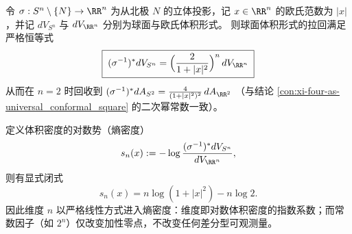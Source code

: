 
\begin{proposition}\label{prop:xi-stereographic-jacobian-entropy-density}
令 \(\sigma:S^{n}\setminus\{N\}\to\RR^{n}\) 为从北极 \(N\) 的立体投影，记 \(x\in\RR^{n}\) 的欧氏范数为 \(|x|\)，并记 \(dV_{S^{n}}\) 与 \(dV_{\RR^{n}}\) 分别为球面与欧氏体积形式。
则球面体积形式的拉回满足严格恒等式
\[
\boxed{\;
(\sigma^{-1})^\ast dV_{S^{n}}
=\Bigl(\frac{2}{1+|x|^{2}}\Bigr)^{n}\,dV_{\RR^{n}}\;}
\]
从而在 \(n=2\) 时回收到
\(
(\sigma^{-1})^\ast dA_{S^{2}}=\frac{4}{(1+|x|^{2})^{2}}\,dA_{\RR^{2}}
\)
（与结论 \ref{con:xi-four-as-universal_conformal_square} 的二次幂常数一致）。
\par
定义体积密度的对数势（熵密度）
\[
s_{n}(x):=-\log\frac{(\sigma^{-1})^\ast dV_{S^{n}}}{dV_{\RR^{n}}},
\]
则有显式闭式
\[
\boxed{\;
s_{n}(x)=n\log(1+|x|^{2})-n\log 2.\;}
\]
因此维度 \(n\) 以严格线性方式进入熵密度：维度即对数体积密度的指数系数；而常数因子（如 \(2^{n}\)）仅改变加性零点，不改变任何差分型可观测量。
\end{proposition}

